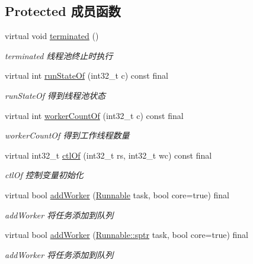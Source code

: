 \subsection*{Protected 成员函数}
\begin{DoxyCompactItemize}
\item 
\mbox{\label{classThreadPoolExecutor_a61774315237123faf8e7fcc9d35ae47d}} 
virtual void \hyperlink{classThreadPoolExecutor_a61774315237123faf8e7fcc9d35ae47d}{terminated} ()
\begin{DoxyCompactList}\small\item\em terminated 线程池终止时执行 \end{DoxyCompactList}\item 
virtual int \hyperlink{classThreadPoolExecutor_acdb626fdcb6ed4c7822508d1e0a3fcf5}{run\+State\+Of} (int32\+\_\+t c) const final
\begin{DoxyCompactList}\small\item\em run\+State\+Of 得到线程池状态 \end{DoxyCompactList}\item 
virtual int \hyperlink{classThreadPoolExecutor_a4f842d070a584bbc16a693207a947aac}{worker\+Count\+Of} (int32\+\_\+t c) const final
\begin{DoxyCompactList}\small\item\em worker\+Count\+Of 得到工作线程数量 \end{DoxyCompactList}\item 
virtual int32\+\_\+t \hyperlink{classThreadPoolExecutor_a31ed7a73571c79c8dbb486f27a4df4eb}{ctl\+Of} (int32\+\_\+t rs, int32\+\_\+t wc) const final
\begin{DoxyCompactList}\small\item\em ctl\+Of 控制变量初始化 \end{DoxyCompactList}\item 
virtual bool \hyperlink{classThreadPoolExecutor_aec8e7c250025db138cde555d759c8194}{add\+Worker} (\hyperlink{classRunnable}{Runnable} task, bool core=true) final
\begin{DoxyCompactList}\small\item\em add\+Worker 将任务添加到队列 \end{DoxyCompactList}\item 
virtual bool \hyperlink{classThreadPoolExecutor_ac2615dd9c245049110104603289beb54}{add\+Worker} (\hyperlink{classRunnable_abe8d3066c7305401d6f0aad8e70780f2}{Runnable\+::sptr} task, bool core=true) final
\begin{DoxyCompactList}\small\item\em add\+Worker 将任务添加到队列 \end{DoxyCompactList}\item 

\end{DoxyCompactItemize}

